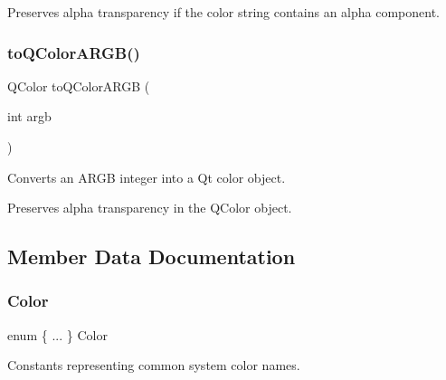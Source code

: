 Preserves alpha transparency if the color string contains an alpha component. \mbox{\label{classsgl_1_1GColor_a979586dd4aaf299d42cf19619ee89280}} 
\subsubsection{\texorpdfstring{to\+Q\+Color\+A\+R\+G\+B()}{toQColorARGB()}}
{\footnotesize\ttfamily Q\+Color to\+Q\+Color\+A\+R\+GB (\begin{DoxyParamCaption}\item[{int}]{argb }\end{DoxyParamCaption})\hspace{0.3cm}{\ttfamily [static]}}



Converts an A\+R\+GB integer into a Qt color object. 

Preserves alpha transparency in the Q\+Color object. 

\subsection{Member Data Documentation}
\mbox{\label{classsgl_1_1GColor_ade7509ad941851393fbb7394bc048f82}} 
\subsubsection{\texorpdfstring{Color}{Color}}
{\footnotesize\ttfamily enum \{ ... \}   Color}



Constants representing common system color names. 


